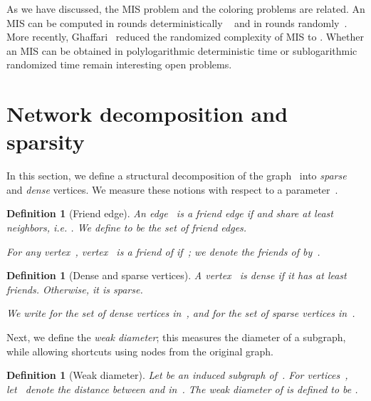 \documentclass[11pt]{amsart}
\newtheorem{definition}[theorem]{Definition}
\begin{document}
As we have discussed, the MIS problem and the coloring problems are related. An MIS can be computed in  rounds deterministically ~\cite{BEK09} and in  rounds randomly~\cite{panc92}. More recently, Ghaffari~\cite{Moh16} reduced the randomized complexity of MIS to . Whether an MIS can be obtained in polylogarithmic deterministic time or sublogarithmic randomized time remain interesting open problems.

\iffalse
A generalization of MIS, known as an \emph{ruling set}, has also been considered. A ()-ruling set~ is a set of vertices such that two nodes  have distance at least~ and for any node~ there exists a node~ with distance at most~~\cite{awer89}.  MIS is a special case, namely a -ruling set.  A number of papers~\cite{gfeller07,sch13,awer89} use ruling sets to compute colorings in different kinds of graphs. A ruling set can be viewed as defining a network decomposition, such that any component has diameter at least~ and at most~.
\fi

\section{Network decomposition and sparsity} \label{decomp-sec}
In this section, we define a structural decomposition of the graph~ into \emph{sparse} and \emph{dense} vertices. We measure  these notions with respect to a parameter~.

\begin{definition}[Friend edge]
An edge~ is a \emph{friend} edge if  and  share at least~ neighbors, i.e. . We define  to be the set of friend edges.

For any vertex~, vertex~ is a friend of  if~; we denote the friends of  by~.
\end{definition}

\begin{definition}[Dense and sparse vertices]
A vertex~ is \emph{dense} if it has at least~ friends. Otherwise, it is \emph{sparse}.

We write  for the set of dense vertices in~, and  for the set of sparse vertices in~.
\end{definition}

Next, we define the \emph{weak diameter}; this measures the diameter of a subgraph, while allowing shortcuts using nodes from the original graph.
\begin{definition}[Weak diameter]
Let  be an induced subgraph of~. For vertices~, let~ denote the distance between  and  in~. The weak diameter of  is defined to be .
\end{definition}
\end{document}
